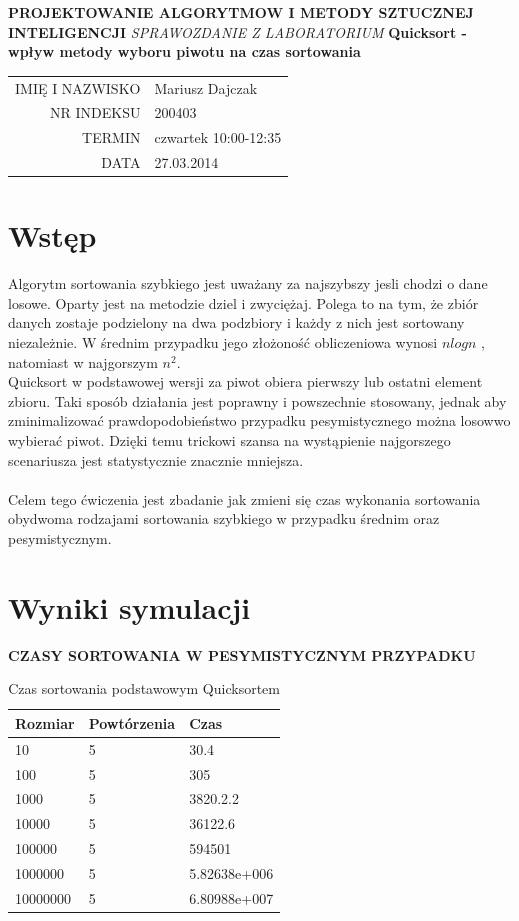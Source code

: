 \documentclass[10pt,oneside]{mwbk}
\renewcommand {\maketitle}{
\begin {titlepage}
\begin {center}
	\LARGE
	\textbf {PROJEKTOWANIE ALGORYTMOW I METODY SZTUCZNEJ INTELIGENCJI}
	\newline
	\newline
	\textit {SPRAWOZDANIE Z  LABORATORIUM}
	\textbf{ Quicksort - wpływ metody wyboru piwotu na czas sortowania}
	\newline
	\begin{table}
	\begin{center}
	\begin{tabular}{rl}
	IMIĘ I NAZWISKO & Mariusz Dajczak \\
	NR INDEKSU & 200403 \\	
	TERMIN & czwartek 10:00-12:35 \\
	DATA  & 27.03.2014 \\
	\end{tabular}

	\end{center}
	\end{table}
\end {center}
\end {titlepage}}
\begin{document}
\maketitle
\section{Wstęp}
	

	\indent Algorytm sortowania szybkiego jest uważany za najszybszy jesli chodzi o dane losowe. Oparty jest na metodzie dziel i zwyciężaj. Polega to na tym, że zbiór danych zostaje podzielony na dwa podzbiory i każdy z nich jest sortowany niezależnie.
	W średnim przypadku jego złożoność obliczeniowa wynosi $nlogn$ , natomiast w najgorszym $n^{2}$.\\
	
	\indent Quicksort w podstawowej wersji za piwot obiera pierwszy lub ostatni element zbioru. Taki sposób działania jest poprawny i powszechnie stosowany, jednak aby zminimalizować prawdopodobieństwo przypadku pesymistycznego można losowwo wybierać piwot. Dzięki temu trickowi szansa na wystąpienie najgorszego scenariusza jest statystycznie znacznie mniejsza.\\
	\\
	\indent Celem tego ćwiczenia jest zbadanie jak zmieni się czas wykonania sortowania obydwoma rodzajami sortowania szybkiego w przypadku średnim oraz pesymistycznym.
	
\section {Wyniki symulacji}
	\textbf{CZASY SORTOWANIA W PESYMISTYCZNYM PRZYPADKU}
	\\

	\begin{table}[!h]
	\centering
	\begin{tabular}{| l | l | l |}
	\hline
	Rozmiar & Powtórzenia & Czas         \\ \hline
	10&5&30.4\\ \hline
100&5&305\\ \hline
1000&5&3820.2.2\\ \hline
10000&5&36122.6\\ \hline
100000&5&594501\\ \hline
1000000&5&5.82638e+006\\ \hline
10000000&5&6.80988e+007\\ \hline
	\end{tabular}
	\caption{Czas sortowania podstawowym Quicksortem}
	\end{table}
	
\end{document}
